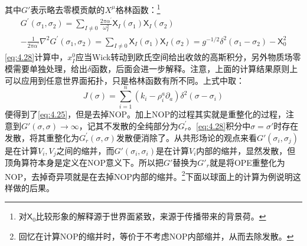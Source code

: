 其中$G'$表示略去零模贡献的$X^\mu$格林函数：\footnote{对$\mathsf{X}_0$比较形象的解释源于世界面紧致，来源于传播带来的背景荷。}
\begin{equation}
	\label{eq:4.29}
	\begin{gathered}
		G^{\prime}(\sigma_1,\sigma_2)=\sum_{I\neq0}\frac{2\pi\alpha^{\prime}}{\omega_I^2}\mathsf{X}_I(\sigma_1)\mathsf{X}_I(\sigma_2)\\
	-\frac{1}{2\pi\alpha^{\prime}}\nabla^2G^{\prime}(\sigma_1,\sigma_2)=\sum_{I\neq0}\mathsf{X}_I(\sigma_1)\mathsf{X}_I(\sigma_2)=g^{-1/2}\delta^2(\sigma_1-\sigma_2)-\mathsf{X}_0^2
	\end{gathered}
\end{equation}
\ref{eq:4.28}计算中，$x^0_I$应当Wick转动到欧氏空间给出收敛的高斯积分，另外物质场零模需要单独处理，给出$\delta$函数，后面会进一步解释。注意，上面的计算结果原则上可以应用到任意世界面拓扑，只是格林函数有所不同。上式中取：
\begin{equation}
	\label{eq:4.30}
	J(\sigma)=\sum_{i=1}^n\left(k_i-\rho^a_i\partial_a\right)\delta^2(\sigma-\sigma_i)
\end{equation}
便得到了\ref{eq:4.25}，但是去掉NOP。加上NOP的过程其实就是重整化的过程，注意到$G'(\sigma,\sigma)\to\infty$，记其不发散的全纯部分为$G^\prime_r$。\ref{eq:4.28}积分中$\sigma=\sigma'$时存在发散，将其重整化为$G^\prime_r(\sigma,\sigma)$发散便消除了。从共形场论的观点来看$G'(\sigma_i,\sigma_j)$是在计算$V_i,V_j$之间的缩并，而$G'(\sigma_i,\sigma_i)$是在计算$V_i$内部的缩并，显然发散，但顶角算符本身是定义在NOP意义下。所以把$G'$替换为$G'_r$就是将OPE重整化为NOP，去掉奇异项就是在去掉NOP内部的缩并。\footnote{回忆在计算NOP的缩并时，等价于不考虑NOP内部缩并，从而去除发散。}下面以球面上的计算为例说明这样做的后果。

